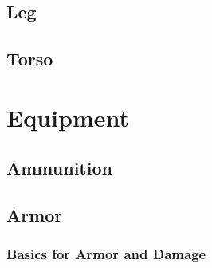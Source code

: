 \documentclass[twoside]{book}
\begin{document}
    

\section{Leg}
    
    

\section{Torso}
    
    

\chapter{Equipment}
    
    

\section{Ammunition}
    
    

\section{Armor}
    
    

\subsection{Basics for Armor and Damage}
    
\end{document}
